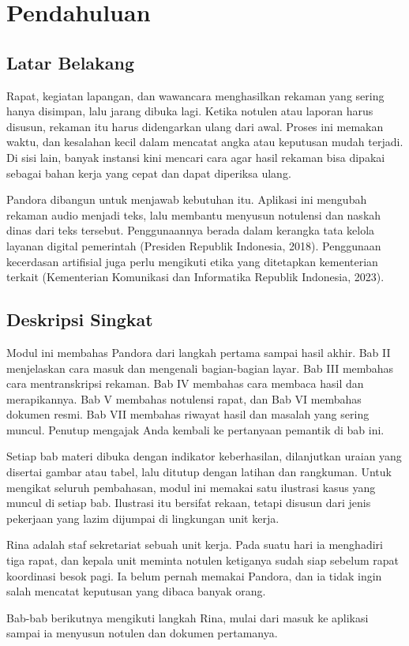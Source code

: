 \chapter{Pendahuluan}

\section{Latar Belakang}
Rapat, kegiatan lapangan, dan wawancara menghasilkan rekaman yang sering hanya disimpan, lalu jarang dibuka lagi. Ketika notulen atau laporan harus disusun, rekaman itu harus didengarkan ulang dari awal. Proses ini memakan waktu, dan kesalahan kecil dalam mencatat angka atau keputusan mudah terjadi. Di sisi lain, banyak instansi kini mencari cara agar hasil rekaman bisa dipakai sebagai bahan kerja yang cepat dan dapat diperiksa ulang.

Pandora dibangun untuk menjawab kebutuhan itu. Aplikasi ini mengubah rekaman audio menjadi teks, lalu membantu menyusun notulensi dan naskah dinas dari teks tersebut. Penggunaannya berada dalam kerangka tata kelola layanan digital pemerintah (Presiden Republik Indonesia, 2018). Penggunaan kecerdasan artifisial juga perlu mengikuti etika yang ditetapkan kementerian terkait (Kementerian Komunikasi dan Informatika Republik Indonesia, 2023).

\section{Deskripsi Singkat}
Modul ini membahas Pandora dari langkah pertama sampai hasil akhir. Bab II menjelaskan cara masuk dan mengenali bagian-bagian layar. Bab III membahas cara mentranskripsi rekaman. Bab IV membahas cara membaca hasil dan merapikannya. Bab V membahas notulensi rapat, dan Bab VI membahas dokumen resmi. Bab VII membahas riwayat hasil dan masalah yang sering muncul. Penutup mengajak Anda kembali ke pertanyaan pemantik di bab ini.

Setiap bab materi dibuka dengan indikator keberhasilan, dilanjutkan uraian yang disertai gambar atau tabel, lalu ditutup dengan latihan dan rangkuman. Untuk mengikat seluruh pembahasan, modul ini memakai satu ilustrasi kasus yang muncul di setiap bab. Ilustrasi itu bersifat rekaan, tetapi disusun dari jenis pekerjaan yang lazim dijumpai di lingkungan unit kerja.

\begin{ilustrasi}
Rina adalah staf sekretariat sebuah unit kerja. Pada suatu hari ia menghadiri tiga rapat, dan kepala unit meminta notulen ketiganya sudah siap sebelum rapat koordinasi besok pagi. Ia belum pernah memakai Pandora, dan ia tidak ingin salah mencatat keputusan yang dibaca banyak orang.

Bab-bab berikutnya mengikuti langkah Rina, mulai dari masuk ke aplikasi sampai ia menyusun notulen dan dokumen pertamanya.
\end{ilustrasi}

